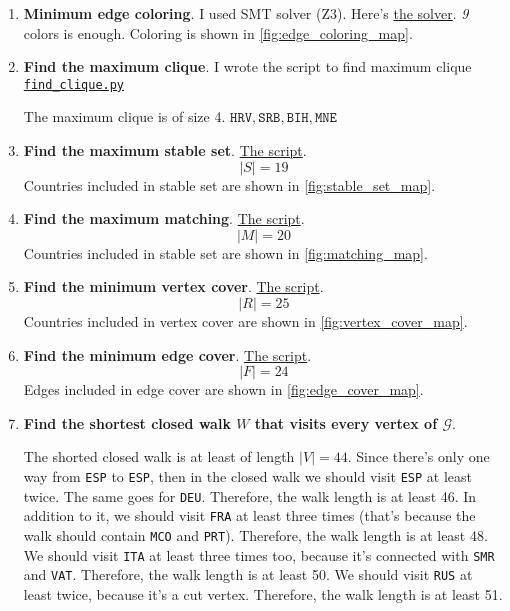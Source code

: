 \documentclass[12pt, a4paper]{article}
\newcommand\EGraphL{\mathcal{G}}
\begin{document}
\begin{enumerate}[label=\alph*)]
\item \textbf{Minimum edge coloring}. I used SMT solver (Z3). Here's
\href{https://github.com/ablearthy-itmo-39828cf299f04949c86/discrete-math-2-hw-1/blob/8bc76f0/auto/edge_coloring.py}{the
solver}.
\textit{9} colors is enough. Coloring is shown in \cref{fig:edge_coloring_map}.

\item \textbf{Find the maximum clique}. I wrote the script to find maximum
clique
\href{https://github.com/ablearthy-itmo-39828cf299f04949c86/discrete-math-2-hw-1/blob/1c391015b3b3a8822ac5e7c6f949004ca919e267/auto/find_clique.py}{\texttt{find\_clique.py}}

The maximum clique is of size 4.
\(\texttt{HRV}, \texttt{SRB}, \texttt{BIH}, \texttt{MNE}\)

\item \textbf{Find the maximum stable set}. \href{https://github.com/ablearthy-itmo-39828cf299f04949c86/discrete-math-2-hw-1/blob/79a6584/auto/stable_set.py}{The script}.
\[|S| = 19\]
Countries included in stable set are shown in \cref{fig:stable_set_map}.

\item \textbf{Find the maximum matching}.
\href{https://github.com/ablearthy-itmo-39828cf299f04949c86/discrete-math-2-hw-1/blob/1fae45a/auto/matching.py}{The
script}.
\[|M| = 20\]
Countries included in stable set are shown in \cref{fig:matching_map}.

\item \textbf{Find the minimum vertex cover}.
\href{https://github.com/ablearthy-itmo-39828cf299f04949c86/discrete-math-2-hw-1/blob/cb98748/auto/vertex_cover.py}{The
script}.
\[|R| = 25\]
Countries included in vertex cover are shown in \cref{fig:vertex_cover_map}.

\item \textbf{Find the minimum edge cover}.
\href{https://github.com/ablearthy-itmo-39828cf299f04949c86/discrete-math-2-hw-1/blob/90b7019/auto/edge_cover.py}{The
script}.
\[|F| = 24\]
Edges included in edge cover are shown in \cref{fig:edge_cover_map}.

\item \textbf{Find the shortest closed walk \(W\) that visits every vertex of
\(\EGraphL\)}.

The shorted closed walk is at least of length \(|V| = 44\).
Since there's only one way from \texttt{ESP} to \texttt{ESP}, then in the closed walk
we should visit \texttt{ESP} at least twice. The same goes for \texttt{DEU}.
Therefore, the walk length is at least 46.
In addition to it, we should visit \texttt{FRA} at least three times (that's because
the walk should contain \texttt{MCO} and \texttt{PRT}).
Therefore, the walk length is at least 48.
We should visit \texttt{ITA} at least three times too, because it's connected with \texttt{SMR} and \texttt{VAT}.
Therefore, the walk length is at least 50.
We should visit \texttt{RUS} at least twice, because it's a cut vertex.
Therefore, the walk length is at least 51.


\end{enumerate}
\end{document}
